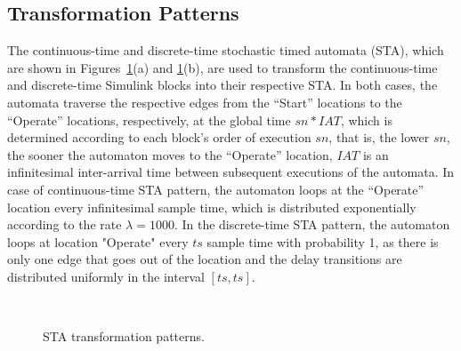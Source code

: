 \subsection*{Transformation Patterns} 
The continuous-time and discrete-time stochastic timed automata (STA), which are shown in Figures~\ref{fig_patterns}(a) and \ref{fig_patterns}(b), are used to transform the continuous-time and discrete-time Simulink blocks into their respective STA. In both cases, the automata traverse the respective edges from the ``Start'' locations to the ``Operate'' locations, respectively, at the global time $sn*IAT$, which is determined according to each block's order of execution $sn$, that is, the lower $sn$, the sooner the automaton moves to the ``Operate'' location, $IAT$ is an infinitesimal inter-arrival time between subsequent executions of the automata. In case of continuous-time STA pattern, the automaton loops at the ``Operate'' location every infinitesimal sample time, which is distributed exponentially according to the rate  $\lambda=1000$. In the discrete-time STA pattern, the automaton loops at location "Operate" every $ts$ sample time with probability 1, as there is only one edge that goes out of the location and the delay transitions are distributed uniformly in the interval $[ts,ts]$.
\begin{figure}[h] 
	\centering
	 ~
	\caption{STA transformation patterns.} 
	\label{fig_patterns}
\end{figure}

